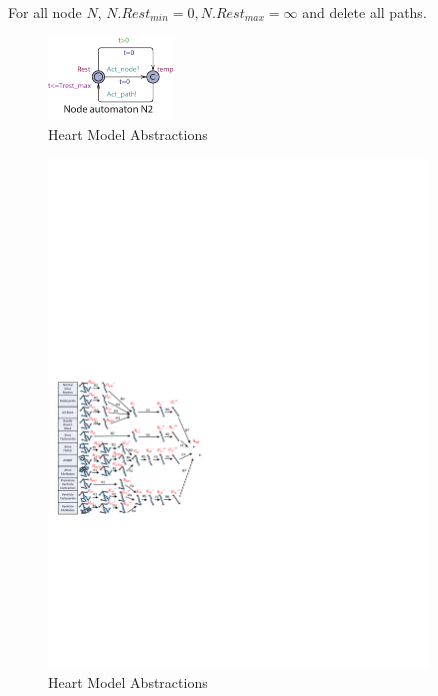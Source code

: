 For all node $N$, $N.Rest_{min}=0,N.Rest_{max}=\infty$ and delete all paths.
\begin{figure}[!h]
		\centering
		\includegraphics[width=0.3\textwidth]{figs/rule6.pdf}
		\caption{\small Heart Model Abstractions}
		\label{fig:rule6}
\end{figure}
\begin{figure}[!t]
		\centering
		\includegraphics[width=0.9\textwidth]{figs/abs.pdf}
		\caption{\small Heart Model Abstractions}
		\label{fig:HM_abs}
\end{figure}

